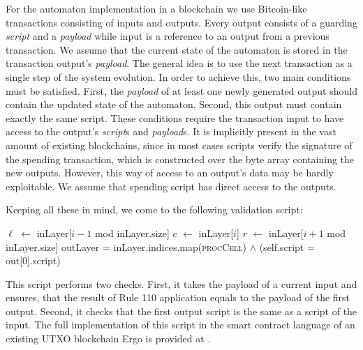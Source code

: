 \documentclass[runningheads]{llncs}
\newcommand{\payload}{\textit{payload}}
\newcommand{\script}{\textit{script}}
\def\Let#1#2{\State #1 $\gets$ #2}
\begin{document}
    For the automaton implementation in a blockchain we use Bitcoin-like
    transactions consisting of inputs and outputs. Every output consists of a
    guarding \script{} and a \payload{} while input is a reference to an
    output from a previous transaction.  We assume that the current state of the
    automaton is stored in the transaction output's \payload{}.  The general
    idea is to use the next transaction as a single step of the system
    evolution. In order to achieve this, two main conditions must be satisfied.
    First, the \payload{} of at least one newly generated output should contain
    the updated state of the automaton. Second, this output must contain exactly
    the same script. These conditions require the transaction input to have
    access to the output's \script{}s and \payload{}s.  It is implicitly present
    in the vast amount of existing blockchains, since in most cases scripts
    verify the signature of the spending transaction, which is constructed over
    the byte array containing the new outputs.  However, this way of access to
    an output's data may be hardly exploitable.  We assume that
    spending script has direct access to the outputs.

    Keeping all these in mind, we come to the following validation script:

    \begin{algorithm}[H]
        \caption{Script, that ensures that the transaction performs correct rule 110 transformation
        keeping the same rules for further iterations}
        \label{alg:isRule110}
        \begin{algorithmic}[1]
            \Let{$\ell$}{inLayer[$i-1$ mod inLayer.size]}
            \Let{$c$}{inLayer[$i$]}
            \Let{$r$}{inLayer[$i+1$ mod inLayer.size]}
            \State
            \Return {}
            \EndFunction
            \State \Return outLayer = inLayer.indices.map(\textsc{procCell})
            \EndFunction
            \State
            \Return {}
            $\wedge$ (self.script = out[0].script)
            \EndFunction
        \end{algorithmic}
    \end{algorithm}

    This script performs two checks. First, it takes the payload of a current
    input and ensures, that the result of Rule 110 application equals to the
    payload of the first output. Second, it checks that the first output script
    is the same as a script of the input. The full implementation of this script
    in the smart contract language of an existing UTXO blockchain Ergo is
    provided at \cite{ergoScript1}.
\end{document}
